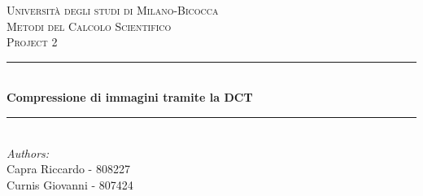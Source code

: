 \documentclass[a4paper,12pt,titlepage,oneside]{book}
\begin{document}
\begin{titlepage}

\newcommand{\HRule}{\rule{\linewidth}{0.5mm}} %

\center %
 

\textsc{\LARGE Università degli studi di Milano-Bicocca}\\[1cm] %
\textsc{\Large Metodi del Calcolo Scientifico }\\[0.3cm] %
\textsc{\large Project 2}\\[0.1cm] %


\HRule \\[0.4cm]
{ \huge \bfseries Compressione di immagini tramite la
DCT}\\[0.4cm] %
\HRule \\[1.5cm]
 

\large
\emph{Authors:}\\
Capra Riccardo - 808227 \\ %
Curnis Giovanni - 807424 \\[1cm]





\end{titlepage}
\end{document}
